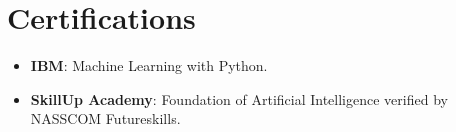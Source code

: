 \documentclass[letterpaper,11pt]{article}
\newcommand{\resumeItem}[1]{
    \item
        \small{#1}
}
\newcommand{\resumeItemListStart}{\begin{itemize}}
\newcommand{\resumeItemListEnd}{\end{itemize}}
\begin{document}
\section{Certifications}
\resumeItemListStart
    \resumeItem
    {\textbf{IBM}: Machine Learning with Python. \href{https://drive.google.com/file/d/12Ia915pkCQcdrRhdlW5tJYu7HmfnpsRj/view?usp=sharing}{\faExternalLink*}}
    \resumeItem
    {\textbf{SkillUp Academy}: Foundation of Artificial Intelligence verified by NASSCOM Futureskills. \href{https://drive.google.com/file/d/1Y4Bm4yFah4c1AELEQ0Li6PR0jnRhj-1W/view?usp=sharing}{\faExternalLink*}}
\resumeItemListEnd
 
\end{document}
